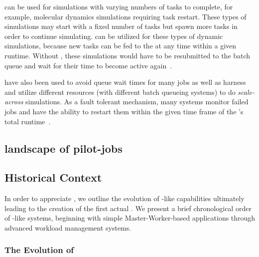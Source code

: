 \documentclass{sig-alternate}
\begin{document}
\pilotjobs can be used for  simulations
 with varying numbers of tasks to complete, for example,
molecular dynamics simulations requiring task restart. These types of 
 simulations may start with a fixed number of tasks but spawn 
 more tasks in order to continue simulating. \pilotjobs can be
utilized for these types of dynamic simulations, because 
new tasks can be fed to the \pilot at any time within a given 
runtime. Without \pilotjobs, these simulations would have to 
be resubmitted to the batch queue and wait for their time
to become active again~\cite{luckow2009adaptive}.

\pilotjobs have also been used to avoid queue wait times for many jobs
as well as harness and utilize different resources (with different
batch queueing systems) to do \textit{scale-across} simulations.
As a fault tolerant mechanism, many \pilotjob systems monitor
failed jobs and have the ability to restart them within the given 
time frame of the \pilotjob's total runtime~\cite{1742-6596-219-6-062049,condor-g,nilsson2011atlas}. 

\subsection{landscape of pilot-jobs}\label{ssec:landscape}


\subsection{Historical Context}\label{ssec:history}

In order to appreciate \pilotjobs, we outline the evolution of
\pilot-like capabilities ultimately leading to the creation of the
first actual \pilotjob. We present a brief chronological order of
\pilotjob-like systems, beginning with simple Master-Worker-based
applications through advanced workload management systems.

\subsubsection*{The Evolution of \pilotjobs}\label{sssec:evolution}

\end{document}
